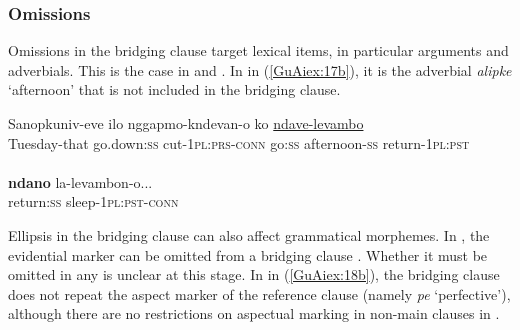 \documentclass[output=paper]{LSP/langsci}
\begin{document}
\subsubsection{Omissions}
\label{GuAi312omiss}
Omissions in the bridging clause target lexical items, in particular arguments and adverbials. This is the case in  \citep[][121]{Phinnemore1998} and  \citep{devries.2005}. In  in (\ref{GuAiex:17b}), it is the adverbial \textit{alipke} ‘afternoon’ that is not included in the bridging clause.

\begin{exe}
\ex \label{GuAiex:17ab}
\begin{xlist}
\ex \label{GuAiex:17a}
\gll Sanopkuniv-eve   ilo     nggapmo-kndevan-o   ko \underline{}   \underline{ndave-levambo}\\
Tuesday-that    go.down:\textsc{ss}   cut-\textsc{1pl:prs-conn}  go:\textsc{ss} afternoon-\textsc{ss}  return-\textsc{1pl:pst}\\
\glt {}\\
\ex \label{GuAiex:17b}
\gll \textbf{ndano} la-levambon-o... \\
return:\textsc{ss}   sleep-\textsc{1pl:pst-conn} \\
\glt {}
\end{xlist}
\end{exe}

Ellipsis in the bridging clause can also affect grammatical morphemes. In , the evidential marker can be omitted from a bridging clause \citep[][392]{schulze73}. Whether it must be omitted in any  is unclear at this stage. In  in (\ref{GuAiex:18b}), the bridging clause does not repeat the aspect marker of the reference clause (namely \textit{pe} ‘perfective’), although there are no restrictions on aspectual marking in non-main clauses in  \citep[][419]{Schokkin13}.
\end{document}
